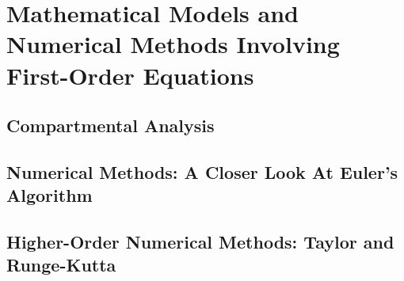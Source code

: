 \documentclass[../diffeq.tex]{subfiles}
\begin{document}
\chapter{Mathematical Models and Numerical Methods Involving First-Order Equations}
\section{Compartmental Analysis}
\section{Numerical Methods: A Closer Look At Euler's Algorithm}
\section{Higher-Order Numerical Methods: Taylor and Runge-Kutta}
\end{document}
